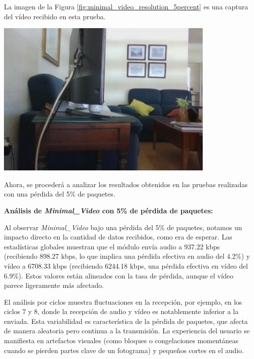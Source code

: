 \newpage
La imagen de la Figura \ref{fig:minimal_video_resolution_5percent} es una captura del vídeo recibido en esta prueba.
\begin{center}
  \includegraphics[width = 0.8\textwidth]{images/VideoRecibido7.3.png}
  \label{fig:minimal_video_resolution_5percent}
\end{center}

\newpage


Ahora, se procederá a analizar los resultados obtenidos en las pruebas realizadas con una pérdida del 5\% de paquetes.
\vspace{\baselineskip}

\textbf{Análisis de \textit{Minimal\_Video} con 5\% de pérdida de paquetes:}
\vspace{\baselineskip}

Al observar \textit{Minimal\_Video} bajo una pérdida del 5\% de paquetes, notamos un impacto directo en la cantidad de datos recibidos, como era de esperar. Las estadísticas globales muestran que el módulo envía audio a 937.22 kbps (recibiendo 898.27 kbps, lo que implica una pérdida efectiva en audio del 4.2\%) y vídeo a 6708.33 kbps (recibiendo 6244.18 kbps, una pérdida efectiva en vídeo del 6.9\%). Estos valores están alineados con la tasa de pérdida, aunque el vídeo parece ligeramente más afectado.
\vspace{\baselineskip}

El análisis por ciclos muestra fluctuaciones en la recepción, por ejemplo, en los ciclos 7 y 8, donde la recepción de audio y vídeo es notablemente inferior a la enviada. Esta variabilidad es característica de la pérdida de paquetes, que afecta de manera aleatoria pero continua a la transmisión. La experiencia del usuario se manifiesta en artefactos visuales (como bloques o congelaciones momentáneas cuando se pierden partes clave de un fotograma) y pequeños cortes en el audio.

